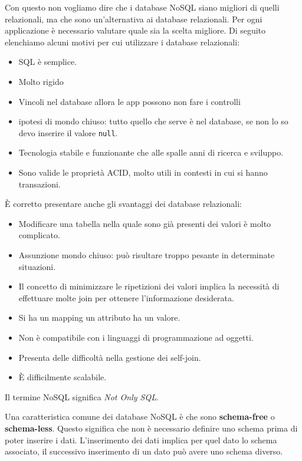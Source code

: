 Con questo non vogliamo dire che i database NoSQL siano migliori di quelli
relazionali, ma che sono un'alternativa ai database relazionali. Per ogni
applicazione è necessario valutare quale sia la scelta migliore. Di seguito
elenchiamo alcuni motivi per cui utilizzare i database relazionali:
\begin{itemize}
    \item SQL è semplice.
    \item Molto rigido
    \item Vincoli nel database allora le app possono non fare i controlli
    \item ipotesi di mondo chiuso: tutto quello che serve è nel database, se non
          lo so devo inserire il valore \texttt{null}.
    \item Tecnologia stabile e funzionante che alle spalle anni di ricerca e
          sviluppo.
    \item Sono valide le proprietà ACID, molto utili in contesti in cui si
          hanno transazioni.
\end{itemize}
È corretto presentare anche gli svantaggi dei database relazionali:
\begin{itemize}
    \item Modificare una tabella nella quale sono già presenti dei valori è molto
          complicato.
    \item Assunzione mondo chiuso: può risultare troppo pesante in determinate
          situazioni.
    \item Il concetto di minimizzare le ripetizioni dei valori implica la necessità
          di effettuare molte join per ottenere l'informazione desiderata.
    \item Si ha un mapping un attributo ha un valore.
    \item Non è compatibile con i linguaggi di programmazione ad oggetti.
    \item Presenta delle difficoltà nella gestione dei self-join.
    \item È difficilmente scalabile.
\end{itemize}
\begin{nota}
    Il termine NoSQL significa \textit{Not Only SQL}.
\end{nota}
Una caratteristica comune dei database NoSQL è che sono \textbf{schema-free} o
\textbf{schema-less}. Questo significa che non è necessario definire uno schema
prima di poter inserire i dati. L'inserimento dei dati implica per quel dato lo
schema associato, il successivo inserimento di un dato può avere uno schema diverso.

